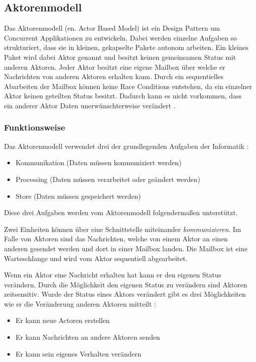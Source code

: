 \subsection{Aktorenmodell}
\label{section:Actor Based Model}

Das Aktorenmodell (en. Actor Based Model) ist ein Design Pattern um Concurrent Applikationen zu entwickeln. Dabei werden einzelne Aufgaben so strukturiert, dass sie in kleinen, gekapselte Pakete autonom arbeiten. Ein kleines Paket wird dabei Aktor genannt und besitzt keinen gemeinsamen Status mit anderen Aktoren. Jeder Aktor besitzt eine eigene Mailbox über welche er Nachrichten von anderen Aktoren erhalten kann. Durch ein sequentielles Abarbeiten der Mailbox können keine Race Conditions entstehen, da ein einzelner Aktor keinen geteilten Status besitzt. Dadurch kann es nicht vorkommen, dass ein anderer Aktor Daten unerwünschterweise verändert \cite[p. 84]{Erb2012}. 

\subsubsection{Funktionsweise}

Das Aktorenmodell verwendet drei der grundlegenden Aufgaben der Informatik \cite[p. 85]{Erb2012}:

\begin{itemize}
  \item Kommunikation (Daten müssen kommuniziert werden)
  \item Processing (Daten müssen verarbeitet oder geändert werden)
  \item Store (Daten müssen gespeichert werden)
\end{itemize}

Diese drei Aufgaben werden vom Aktorenmodell folgendermaßen unterstützt.

Zwei Einheiten können über eine Schnittstelle miteinander \emph{kommunizieren}. Im Falle von Aktoren sind das Nachrichten, welche von einem Aktor an einen anderen gesendet werden und dort in einer Mailbox landen. Die Mailbox ist eine Warteschlange und wird vom Aktor sequentiell abgearbeitet. 

Wenn ein Aktor eine Nachricht erhalten hat kann er den eigenen Status verändern. Durch die Möglichkeit den eigenen Status zu verändern sind Aktoren zeitsensitiv. Wurde der Status eines Aktors verändert gibt es drei Möglichkeiten wie er die Veränderung anderen Aktoren mitteilt \cite[p. 84]{Erb2012}:

\begin{itemize}
  \item Er kann neue Actoren erstellen
  \item Er kann Nachrichten an andere Aktoren senden
  \item Er kann sein eigenes Verhalten verändern
\end{itemize}

